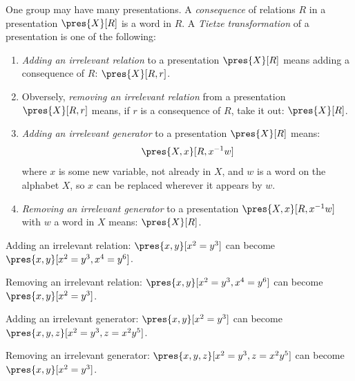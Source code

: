 One group may have many presentations.
A \emph{consequence} of relations \(R\) in a presentation \(\pres{X}[R]\) is a word in \(R\).
A \emph{Tietze transformation} of a presentation is one of the following:
\begin{enumerate}
\item
\emph{Adding an irrelevant relation} to a presentation \(\pres{X}[R]\) means adding a consequence of \(R\): \(\pres{X}[R,r]\).
\item
Obversely, \emph{removing an irrelevant relation} from a presentation \(\pres{X}[R,r]\) means, if \(r\) is a consequence of \(R\), take it out: \(\pres{X}[R]\).
\item
\emph{Adding an irrelevant generator} to a presentation \(\pres{X}[R]\) means: 
\[
\pres{X,x}[R,x^{-1}w]
\] 
where \(x\) is some new variable, not already in \(X\), and \(w\) is a word on the alphabet \(X\), so \(x\) can be replaced wherever it appears by \(w\).
\item
\emph{Removing an irrelevant generator} to a presentation \(\pres{X,x}[R,x^{-1}w]\) with \(w\) a word in \(X\) means: \(\pres{X}[R]\).
\end{enumerate}

\begin{example}
Adding an irrelevant relation: \(\pres{x,y}[x^2=y^3]\) can become \(\pres{x,y}[x^2=y^3,x^4=y^6]\).
\end{example}

\begin{example}
Removing an irrelevant relation: \(\pres{x,y}[x^2=y^3,x^4=y^6]\) can become \(\pres{x,y}[x^2=y^3]\).
\end{example}

\begin{example}
Adding an irrelevant generator: \(\pres{x,y}[x^2=y^3]\) can become \(\pres{x,y,z}[x^2=y^3,z=x^2y^5]\).
\end{example}

\begin{example}
Removing an irrelevant generator: \(\pres{x,y,z}[x^2=y^3,z=x^2y^5]\) can become \(\pres{x,y}[x^2=y^3]\).
\end{example}


